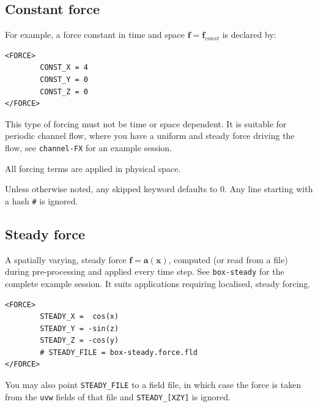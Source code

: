 \documentclass[11pt]{report}
\begin{document}
\subsection{Constant force}
\label{sec.constant}

\noindent For example, a force constant in time and space $\bm{f} =
\bm{f}_{const}$ is declared by:
\begin{verbatim}
<FORCE>
        CONST_X = 4
        CONST_Y = 0
        CONST_Z = 0
</FORCE>
\end{verbatim}
This type of forcing must not be time or space dependent. It is suitable
for periodic channel flow, where you have a uniform and steady force
driving the flow, see \verb+channel-FX+ for an example session.

All forcing terms are applied in physical space.

Unless otherwise noted, any skipped keyword defaults to 0. Any line
starting with a hash \verb+#+ is ignored.

\subsection{Steady force}
\label{sec.steady}

A spatially varying, steady force $\bm{f} = \bm{a}(\bm{x})$, computed
(or read from a file) during pre-processing and applied every time
step. See \verb|box-steady| for the complete example session. It suits
applications requiring localised, steady forcing.
\begin{verbatim}
<FORCE>
        STEADY_X =  cos(x)
        STEADY_Y = -sin(z)
        STEADY_Z = -cos(y)
        # STEADY_FILE = box-steady.force.fld
</FORCE>
\end{verbatim}

You may also point \verb+STEADY_FILE+ to a field file, in which case
the force is taken from the \verb+uvw+ fields of that file and
\verb+STEADY_[XZY]+ is ignored.
\end{document}
